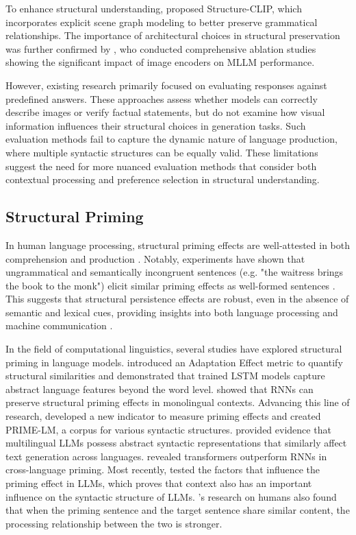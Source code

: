 To enhance structural understanding, \citet{huang2023structureclipscenegraphknowledge} proposed Structure-CLIP, which incorporates explicit scene graph modeling to better preserve grammatical relationships. The importance of architectural choices in structural preservation was further confirmed by \citet{mckinzie2024mm1methodsanalysis}, who conducted comprehensive ablation studies showing the significant impact of image encoders on MLLM performance.

However, existing research primarily focused on evaluating responses against predefined answers. These approaches assess whether models can correctly describe images or verify factual statements, but do not examine how visual information influences their structural choices in generation tasks. Such evaluation methods fail to capture the dynamic nature of language production, where multiple syntactic structures can be equally valid. These limitations suggest the need for more nuanced evaluation methods that consider both contextual processing and preference selection in structural understanding.

\subsection{Structural Priming}
 In human language processing, structural priming effects are well-attested in both comprehension and production \citep{tooley2014parity}. Notably, experiments have shown that ungrammatical and semantically incongruent sentences (e.g. "the waitress brings the book to the monk") elicit similar priming effects as well-formed sentences \citep{ivanova2017you}. This suggests that structural persistence effects are robust, even in the absence of semantic and lexical cues, providing insights into both language processing and machine communication \citep{linzen2021syntactic}.

In the field of computational linguistics, several studies have explored structural priming in language models. \citet{prasad2019using} introduced an Adaptation Effect metric to quantify structural similarities and demonstrated that trained LSTM models capture abstract language features beyond the word level. \citet{frank2019neural} showed that RNNs can preserve structural priming effects in monolingual contexts. Advancing this line of research, \citet{sinclair-etal-2022-structural} developed a new indicator to measure priming effects and created PRIME-LM, a corpus for various syntactic structures. \citet{michaelov_structural_2023} provided evidence that multilingual LLMs possess abstract syntactic representations that similarly affect text generation across languages. \citet{zhang2024modelingbilingualsentenceprocessing} revealed transformers outperform RNNs in cross-language priming. Most recently, \citet{jumelet2024language} tested the factors that influence the priming effect in LLMs, which proves that context also has an important influence on the syntactic structure of LLMs. \citet{tooley2025putting}'s research on humans also found that when the priming sentence and the target sentence share similar content, the processing relationship between the two is stronger.

%